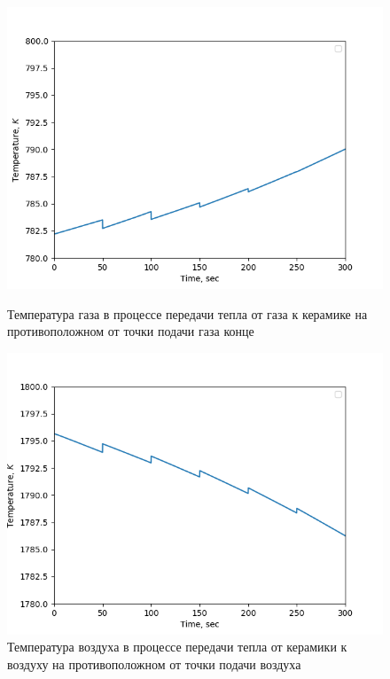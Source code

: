 \documentclass[a4paper,12pt]{article}
\begin{document}
\begin{figure}[ht]
    \centering
    \begin{minipage}[t]{0.23\textwidth}
        \centering
        \includegraphics[width=\textwidth]{img1}
        \caption {Температура газа в процессе передачи тепла от газа к
        керамике на противоположном от точки подачи газа конце}
        \label{fig:img1}
    \end{minipage}
    \hfill
    \begin{minipage}[t]{0.23\textwidth}
        \centering
        \includegraphics[width=\textwidth]{img2}
        \caption {Температура воздуха в процессе передачи тепла от
        керамики к воздуху на противоположном от точки подачи воздуха
}
\end{minipage}
\end{figure}
\end{document}
